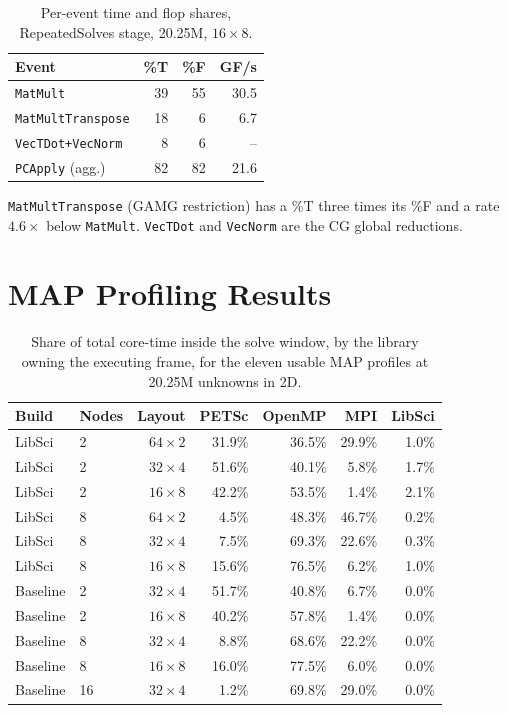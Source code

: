 \documentclass[12pt,a4paper,notitlepage]{report}
\begin{document}
\begin{table}[htbp]
  \centering
  \caption{Per-event time and flop shares, RepeatedSolves stage, 20.25M, $16\times8$.}
  \label{tab:tf}
  \begin{tabular}{lrrr}
    \toprule
    Event & \%T & \%F & GF/s \\
    \midrule
    \texttt{MatMult}          & 39 & 55 & 30.5 \\
    \texttt{MatMultTranspose} & 18 &  6 &  6.7 \\
    \texttt{VecTDot+VecNorm}  &  8 &  6 & --   \\
    \texttt{PCApply} (agg.)   & 82 & 82 & 21.6 \\
    \bottomrule
  \end{tabular}
\end{table}

\texttt{MatMultTranspose} (GAMG restriction) has a \%T three times its \%F and a rate
$4.6\times$ below \texttt{MatMult}. \texttt{VecTDot} and \texttt{VecNorm} are the CG global
reductions.

\section{MAP Profiling Results}






\begin{table}[htbp]
  \centering
  \caption{Share of total core-time inside the solve window, by the library owning the
  executing frame, for the eleven usable MAP profiles at 20.25M unknowns in 2D.}
  \label{tab:map-shares}
  \begin{tabular}{llrrrrr}
    \toprule
    Build & Nodes & Layout & PETSc & OpenMP & MPI & LibSci \\
    \midrule
    LibSci   &  2 & $64\times2$ & 31.9\% & 36.5\% & 29.9\% & 1.0\% \\
    LibSci   &  2 & $32\times4$ & 51.6\% & 40.1\% &  5.8\% & 1.7\% \\
    LibSci   &  2 & $16\times8$ & 42.2\% & 53.5\% &  1.4\% & 2.1\% \\
    \addlinespace
    LibSci   &  8 & $64\times2$ &  4.5\% & 48.3\% & 46.7\% & 0.2\% \\
    LibSci   &  8 & $32\times4$ &  7.5\% & 69.3\% & 22.6\% & 0.3\% \\
    LibSci   &  8 & $16\times8$ & 15.6\% & 76.5\% &  6.2\% & 1.0\% \\
    \addlinespace
    Baseline &  2 & $32\times4$ & 51.7\% & 40.8\% &  6.7\% & 0.0\% \\
    Baseline &  2 & $16\times8$ & 40.2\% & 57.8\% &  1.4\% & 0.0\% \\
    Baseline &  8 & $32\times4$ &  8.8\% & 68.6\% & 22.2\% & 0.0\% \\
    Baseline &  8 & $16\times8$ & 16.0\% & 77.5\% &  6.0\% & 0.0\% \\
    Baseline & 16 & $32\times4$ &  1.2\% & 69.8\% & 29.0\% & 0.0\% \\
    \bottomrule
  \end{tabular}
\end{table}
\end{document}
